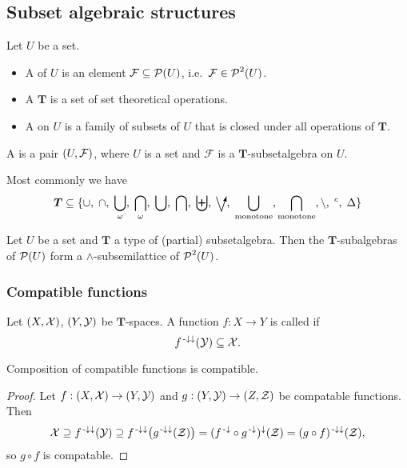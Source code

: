 \subsection{Subset algebraic structures}
\begin{definition}
Let $U$ be a set.
\begin{itemize}
\item A  of $U$ is an element $\mathcal{F}\subseteq\operatorname{\mathcal{P}}(U)$, i.e.\ $\mathcal{F}\in\operatorname{\mathcal{P}}^2(U)$.
\item A  $\boldsymbol{T}$ is a set of set theoretical operations.
\item A  on $U$ is a family of subsets of $U$ that is closed under all operations of $\boldsymbol{T}$.
\end{itemize}
A  is a pair $\sSet{U,\mathcal{F}}$, where $U$ is a set and $\mathcal{F}$ is a $\boldsymbol{T}$-subsetalgebra on $U$.
\end{definition}
Most commonly we have
\[ \boldsymbol{T} \subseteq \{\cup,\; \cap,\; \bigcup_\omega,\; \bigcap_\omega,\; \bigcup,\; \bigcap,\; \biguplus,\; \dirvee,\; \bigcup_\text{monotone}, \bigcap_\text{monotone}, \setminus,\; ^c,\; \symdiff \} \]

\begin{proposition}
Let $U$ be a set and $\boldsymbol{T}$ a type of (partial) subsetalgebra. Then the $\boldsymbol{T}$-subalgebras of $\operatorname{\mathcal{P}}(U)$ form a $\wedge$-subsemilattice of $\operatorname{\mathcal{P}}^2(U)$.
\end{proposition}

\subsubsection{Compatible functions}
\begin{definition}
Let $\sSet{X, \mathcal{X}}$, $\sSet{Y, \mathcal{Y}}$ be $\boldsymbol{T}$-spaces. A function $f: X\to Y$ is called  if
\[ f^{{\text{\hspace{0.15em}-}\downarrow}\downarrow}(\mathcal{Y}) \subseteq \mathcal{X}. \]
\end{definition}

\begin{proposition} \label{compositionCompatibleFunctions}
Composition of compatible functions is compatible.
\end{proposition}
\begin{proof}
Let $f: \sSet{X,\mathcal{X}} \to \sSet{Y,\mathcal{Y}}$ and $g: \sSet{Y,\mathcal{Y}} \to \sSet{Z,\mathcal{Z}}$ be compatable functions. Then
\[ \mathcal{X} \supseteq f^{{\text{\hspace{0.15em}-}\downarrow}\downarrow}(\mathcal{Y}) \supseteq f^{{\text{\hspace{0.15em}-}\downarrow}\downarrow}\big(g^{{\text{\hspace{0.15em}-}\downarrow}\downarrow}(\mathcal{Z})\big) = (f^{{\text{\hspace{0.15em}-}\downarrow}} \circ g^{{\text{\hspace{0.15em}-}\downarrow}})^{\downarrow}(\mathcal{Z}) = (g\circ f)^{{\text{\hspace{0.15em}-}\downarrow}\downarrow}(\mathcal{Z}), \]
so $g \circ f$ is compatable.
\end{proof}

